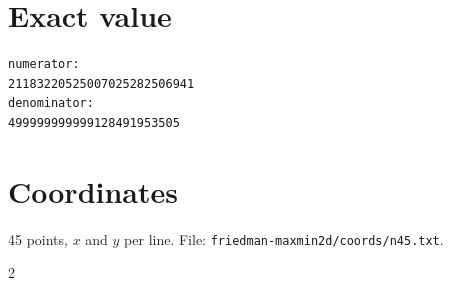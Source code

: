 \documentclass[11pt,a4paper]{article}
\begin{document}
\appendix
\section{Exact value}
{\small
\begin{verbatim}
numerator:
21183220525007025282506941
denominator:
499999999999128491953505
\end{verbatim}}

\section{Coordinates}
45 points, $x$ and $y$ per line. File: \texttt{friedman-maxmin2d/coords/n45.txt}.
{\tiny
\begin{multicols}{2}
\end{multicols}}
\end{document}
